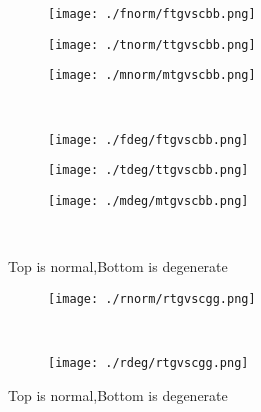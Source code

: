\documentclass[aps,floats,floatfix,nofootinbib]{revtex4-1}
\begin{document}
\begin{center}
\begin{figure}
\begin{subfigure}{0.3\textwidth}
\texttt{[image: ./fnorm/ftgvscbb.png]}
\label{}
\end{subfigure}
\begin{subfigure}{0.3\textwidth}
\texttt{[image: ./tnorm/ttgvscbb.png]}
\label{}
\end{subfigure}
\begin{subfigure}{0.3\textwidth}
\texttt{[image: ./mnorm/mtgvscbb.png]}
\label{}
\end{subfigure}\\
\begin{subfigure}{0.3\textwidth}
\texttt{[image: ./fdeg/ftgvscbb.png]}
\label{}
\end{subfigure}
\begin{subfigure}{0.3\textwidth}
\texttt{[image: ./tdeg/ttgvscbb.png]}
\label{}
\end{subfigure}
\begin{subfigure}{0.3\textwidth}
\texttt{[image: ./mdeg/mtgvscbb.png]}
\label{}
\end{subfigure}\\
\caption{Top is normal,Bottom is degenerate}
\end{figure}
\end{center}

\begin{center}
\begin{figure}
\begin{subfigure}{0.95\textwidth}
\texttt{[image: ./rnorm/rtgvscgg.png]}
\label{}
\end{subfigure}\\
\begin{subfigure}{0.95\textwidth}
\texttt{[image: ./rdeg/rtgvscgg.png]}
\label{}
\end{subfigure}
\caption{Top is normal,Bottom is degenerate}
\end{figure}
\end{center}
\end{document}
